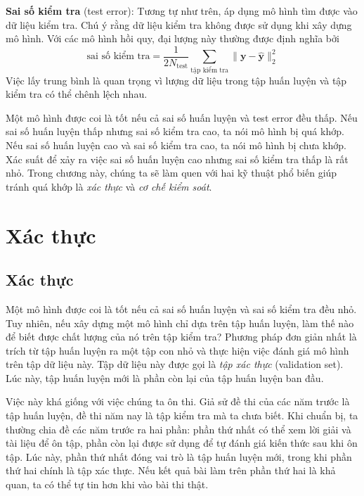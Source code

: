 \textbf{Sai số kiểm tra} (test error): Tương tự như trên, áp dụng mô hình tìm được vào dữ liệu kiểm tra. Chú ý rằng dữ liệu kiểm tra không được sử dụng khi xây dựng mô hình. Với các mô hình hồi quy, đại lượng này thường được định nghĩa bởi
\begin{equation*}
\text{sai số kiểm tra}= \frac{1}{2N_{\text{test}}} \sum_{\text{tập kiểm tra}} \|\mathbf{y} - \mathbf{\hat{y}}\|_2^2
\end{equation*}
{Việc lấy trung bình là quan trọng vì lượng dữ liệu trong tập huấn
luyện và tập kiểm tra có thể chênh lệch nhau.}

Một mô hình được coi là tốt nếu cả {sai số huấn luyện} và {test
error} đều thấp. Nếu {sai số huấn luyện} thấp nhưng {sai số kiểm tra} cao,
ta nói mô hình bị quá khớp. Nếu {sai số huấn luyện} cao và {sai số kiểm tra} cao, ta nói mô hình bị chưa khớp. Xác suất để xảy ra việc
{sai số huấn luyện} cao nhưng {sai số kiểm tra} thấp là rất nhỏ.
Trong chương này, chúng ta sẽ làm quen với hai kỹ thuật phổ biến giúp tránh
quá khớp là \textit{xác thực} và \textit{cơ chế kiểm soát}.

\section{Xác thực}
\subsection{Xác thực}

Một mô hình được coi là tốt nếu cả sai số huấn luyện và sai số kiểm tra đều nhỏ. Tuy
nhiên, nếu xây dựng một mô hình {chỉ} dựa trên tập huấn luyện, làm thế nào để
biết được chất lượng của nó trên tập kiểm tra?
Phương pháp đơn giản nhất là {trích} từ tập huấn luyện ra một tập con nhỏ và
thực hiện việc đánh giá mô hình trên tập dữ liệu này. Tập dữ liệu này được gọi
là \textit{tập xác thực} ({validation set}). Lúc này, {tập huấn luyện mới
là phần còn lại của tập huấn luyện ban đầu}.

Việc này khá giống với việc chúng ta ôn thi. Giả sử đề thi của các năm trước là
tập huấn luyện, đề thi năm nay là tập kiểm tra mà ta chưa biết. Khi chuẩn bị,
ta thường chia đề các năm trước ra hai phần: phần thứ nhất có thể xem lời giải
và tài liệu để ôn tập, phần còn lại được sử dụng để tự đánh giá kiến thức sau
khi ôn tập. Lúc này, phần thứ nhất đóng vai trò là tập huấn luyện mới, trong khi
phần thứ hai chính là tập xác thực. Nếu kết quả bài làm trên phần thứ hai là
khả quan, ta có thể tự tin hơn khi vào bài thi thật.




